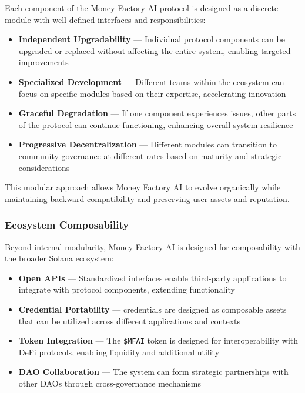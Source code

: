 Each component of the Money Factory AI protocol is designed as a discrete module with well-defined interfaces and responsibilities:

\begin{itemize}
    \item \textbf{Independent Upgradability} — Individual protocol components can be upgraded or replaced without affecting the entire system, enabling targeted improvements
    
    \item \textbf{Specialized Development} — Different teams within the ecosystem can focus on specific modules based on their expertise, accelerating innovation
    
    \item \textbf{Graceful Degradation} — If one component experiences issues, other parts of the protocol can continue functioning, enhancing overall system resilience
    
    \item \textbf{Progressive Decentralization} — Different modules can transition to community governance at different rates based on maturity and strategic considerations
\end{itemize}

This modular approach allows Money Factory AI to evolve organically while maintaining backward compatibility and preserving user assets and reputation.

\subsubsection*{Ecosystem Composability}

Beyond internal modularity, Money Factory AI is designed for composability with the broader Solana ecosystem:

\begin{itemize}
    \item \textbf{Open APIs} — Standardized interfaces enable third-party applications to integrate with protocol components, extending functionality
    
    \item \textbf{Credential Portability} —  credentials are designed as composable assets that can be utilized across different applications and contexts
    
    \item \textbf{Token Integration} — The \texttt{\$MFAI} token is designed for interoperability with DeFi protocols, enabling liquidity and additional utility
    
    \item \textbf{DAO Collaboration} — The  system can form strategic partnerships with other DAOs through cross-governance mechanisms
\end{itemize}


